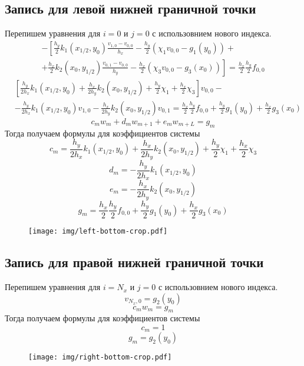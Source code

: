 \subsection{Запись для левой нижней граничной точки}
Перепишем уравнения для $i = 0$ и $j = 0$ с использовнием нового индекса.
\begin{multline*}
    - \left[
    \frac{h_y}{2} k_1(x_{1/2},y_{0}) \frac{v_{1,0} - v_{0,0}}{h_x} - \frac{h_y}{2} \left( \chi_1 v_{0,0} - g_1(y_{0}) \right) + \right. \\
    \left. +
    \frac{h_x}{2} k_2(x_{0},y_{1/2}) \frac{v_{0,1} - v_{0,0}}{h_y} - \frac{h_x}{2} \left( \chi_3 v_{0,0} - g_3(x_{0}) \right)
    \right] =
    \frac{h_x}{2} \frac{h_y}{2} f_{0,0}
\end{multline*}
\[
\begin{split}
    &\left[ \frac{h_y}{2 h_x} k_1(x_{1/2},y_{0}) + \frac{h_x}{2 h_y} k_2(x_{0},y_{1/2}) + \frac{h_y}{2} \chi_1 + \frac{h_x}{2} \chi_3 \right] v_{0,0} - \\
    &-\frac{h_y}{2 h_x} k_1(x_{1/2},y_{0}) v_{1,0} - \frac{h_x}{2 h_y} k_2(x_{0},y_{1/2}) v_{0,1} = \frac{h_x}{2} \frac{h_y}{2} f_{0,0} + \frac{h_y}{2} g_1(y_0) + \frac{h_x}{2} g_3(x_0)
\end{split}
\]
\[ c_m w_m + d_m w_{m + 1} + e_m w_{m + L} = g_m \]
Тогда получаем формулы для коэффициентов системы
\[ c_m = \frac{h_y}{2 h_x} k_1(x_{1/2},y_{0}) + \frac{h_x}{2 h_y} k_2(x_{0},y_{1/2}) + \frac{h_y}{2} \chi_1 + \frac{h_x}{2} \chi_3 \]
\[ d_m = -\frac{h_y}{2 h_x} k_1(x_{1/2},y_{0}) \]
\[ e_m = -\frac{h_x}{2 h_y} k_2(x_{0},y_{1/2}) \]
\[ g_m = \frac{h_x}{2} \frac{h_y}{2} f_{0,0} + \frac{h_y}{2} g_1(y_0) + \frac{h_x}{2} g_3(x_0) \]
\begin{figure}[H]
    \centering
    \texttt{[image: img/left-bottom-crop.pdf]}
\end{figure}

\subsection{Запись для правой нижней граничной точки}
Перепишем уравнения для $i = N_x$ и $j = 0$ с использовнием нового индекса.
\[ v_{N_x,0} = g_2(y_0) \]
\[ c_m w_m = g_m \]
Тогда получаем формулы для коэффициентов системы
\[ c_m = 1 \]
\[ g_m = g_2(y_0) \]
\begin{figure}[H]
    \centering
    \texttt{[image: img/right-bottom-crop.pdf]}
\end{figure}

